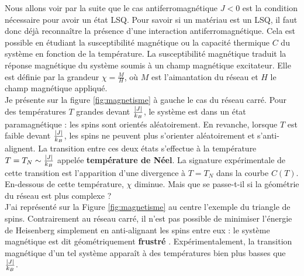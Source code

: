 Nous allons voir par la suite que le cas antiferromagnétique $J<0$ est la condition nécessaire pour avoir un état LSQ. Pour savoir si un matériau est un LSQ, il faut donc déjà reconnaître la présence d'une interaction antiferromagnétique. Cela est possible en étudiant la susceptibilité magnétique ou la capacité thermique $C$ du système en fonction de la température. La susceptibilité magnétique traduit la réponse magnétique du système soumis à un champ magnétique excitateur. Elle est définie par la grandeur $\chi=\frac{M}{H}$, où $M$ est l'aimantation du réseau et $H$ le champ magnétique appliqué.\\
Je présente sur la figure \ref{fig:magnetisme} à gauche le cas du réseau carré. Pour des températures $T$ grandes devant $\frac{\abs{J}}{k_B}$, le système est dans un état paramagnétique : les spins sont orientés aléatoirement. En revanche, lorsque $T$ est faible devant $\frac{\abs{J}}{k_B}$, les spins ne peuvent plus s'orienter aléatoirement et s'anti-alignent. La transition entre ces deux états s'effectue à la température $T=T_{N}\sim \frac{\abs{J}}{k_B}$ appelée \textbf{température de Néel}. La signature expérimentale de cette transition est l'apparition d'une divergence à $T=T_{N}$ dans la courbe $C(T)$. En-dessous de cette température, $\chi$ diminue. %
Mais que se passe-t-il si la géométrie du réseau est plus complexe ? \\ 
J'ai représenté sur la Figure \ref{fig:magnetisme} au centre l'exemple du triangle de spins. Contrairement au réseau carré, il n'est pas possible de minimiser l'énergie de Heisenberg simplement en anti-alignant les spins entre eux : le système magnétique est dit géométriquement \og \textbf{frustré} \fg. Expérimentalement, la transition magnétique d'un tel système apparaît à des températures bien plus basses que $\frac{\abs{J}}{k_B}$.\\
